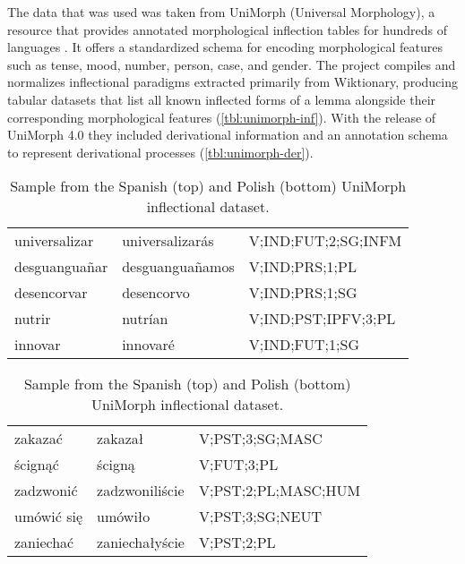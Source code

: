 \documentclass[12pt]{article}
\begin{document}
The data that was used was taken from UniMorph (Universal Morphology), a resource that provides annotated morphological inflection tables for hundreds of languages \parencite{batsuren2022UniMorph40Universal}. It offers a standardized schema for encoding morphological features such as tense, mood, number, person, case, and gender. The project compiles and normalizes inflectional paradigms extracted primarily from Wiktionary, producing tabular datasets that list all known inflected forms of a lemma alongside their corresponding morphological features (\autoref{tbl:unimorph-inf}). With the release of UniMorph 4.0 they included derivational information and an annotation schema to represent derivational processes (\autoref{tbl:unimorph-der}).

\begin{table}[htbp]
    \footnotesize
    \centering
    \begin{tabular}{p{3cm}p{3.5cm}p{4.5cm}}
        \toprule
        universalizar & universalizarás &  V;IND;FUT;2;SG;INFM \\
        desguanguañar & desguanguañamos & V;IND;PRS;1;PL \\
        desencorvar  &    desencorvo    &   V;IND;PRS;1;SG \\
        nutrir    &      nutrían  &  V;IND;PST;IPFV;3;PL \\
        innovar    &     innovaré    &   V;IND;FUT;1;SG \\
    \end{tabular}
        \begin{tabular}{p{3cm}p{3.5cm}p{4.5cm}}
        \midrule
        zakazać        &  zakazał   &    V;PST;3;SG;MASC \\
        ścignąć         &  ścigną &           V;FUT;3;PL \\
        zadzwonić &  zadzwoniliście &  V;PST;2;PL;MASC;HUM \\
        umówić się        &  umówiło &      V;PST;3;SG;NEUT \\
        zaniechać &  zaniechałyście &           V;PST;2;PL \\
        \bottomrule
    \end{tabular}
    \caption{Sample from the Spanish (top) and Polish (bottom) UniMorph inflectional dataset.}
    \label{tbl:unimorph-inf}
\end{table}
\end{document}
